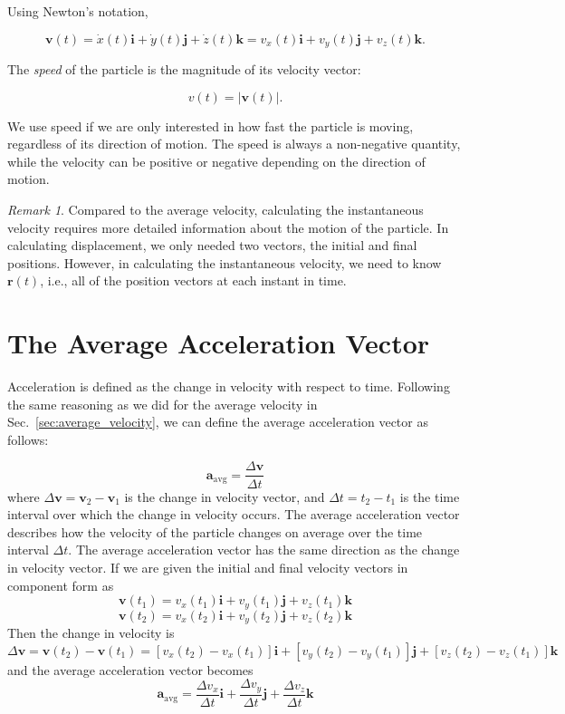 \documentclass[../main.tex]{subfiles}
\theoremstyle{remark}
\newtheorem*{remark}{Remark}
\begin{document}
Using Newton's notation,

\begin{equation}
\mathbf{v}(t)
=
\dot{x}(t)\mathbf{i}
+
\dot{y}(t)\mathbf{j}
+
\dot{z}(t)\mathbf{k}
=
v_x(t)\mathbf{i}
+
v_y(t)\mathbf{j}
+
v_z(t)\mathbf{k}.
\end{equation}

The \emph{speed} of the particle is the magnitude of its velocity vector:

\begin{equation}
v(t)
=
\lvert\mathbf{v}(t)\rvert.
\end{equation}

We use speed if we are only interested in how fast the particle is moving, regardless of its direction of motion. The speed is always a non-negative quantity, while the velocity can be positive or negative depending on the direction of motion.

\begin{remark}
    Compared to the average velocity, calculating the instantaneous velocity requires more detailed information about the motion of the particle. In calculating displacement, we only needed two vectors, the initial and final positions. However, in calculating the instantaneous velocity, we need to know $\mathbf{r}(t)$, i.e., all of the position vectors at each instant in time.   
\end{remark}



\section{The Average Acceleration Vector}
Acceleration is defined as the change in velocity with respect to time. Following the same reasoning as we did for the average velocity in Sec.~\ref{sec:average_velocity}, we can define the average acceleration vector as follows:

\begin{equation}
\mathbf{a}_\text{avg} = \frac{\Delta \mathbf{v}}{\Delta t}
\end{equation}
where \(\Delta \mathbf{v} = \mathbf{v}_2 - \mathbf{v}_1\) is the change in velocity vector, and \(\Delta t = t_2 - t_1\) is the time interval over which the change in velocity occurs. The average acceleration vector describes how the velocity of the particle changes on average over the time interval \(\Delta t\). The average acceleration vector has the same direction as the change in velocity vector. If we are given the initial and final velocity vectors in component form as
\[
\mathbf{v}(t_1)=v_{x}(t_1)\mathbf{i} + v_{y}(t_1)\mathbf{j} + v_{z}(t_1)\mathbf{k}   
\]
\[
\mathbf{v}(t_2)=v_{x}(t_2)\mathbf{i} + v_{y}(t_2)\mathbf{j} + v_{z}(t_2)\mathbf{k}
\]
Then the change in velocity is
\[
\Delta \mathbf{v} = \mathbf{v}(t_2) - \mathbf{v}(t_1) = [v_{x}(t_2)-v_{x}(t_1)]\mathbf{i} + [v_{y}(t_2)-v_{y}(t_1)]\mathbf{j} + [v_{z}(t_2)-v_{z}(t_1)]\mathbf{k}
\]
and the average acceleration vector becomes
\[
\mathbf{a}_\text{avg}= \frac{\Delta v_x}{\Delta t}\mathbf{i}+\frac{\Delta v_y}{\Delta t}\mathbf{j}+\frac{\Delta v_z}{\Delta t}\mathbf{k}
\]
\end{document}
